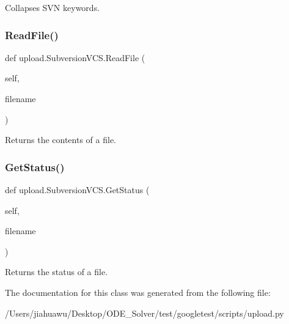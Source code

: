 \begin{DoxyVerb}Collapses SVN keywords.\end{DoxyVerb}
 \mbox{\label{classupload_1_1_subversion_v_c_s_a340d269b74386ac863636f6b0683d9f4}} 
\subsubsection{\texorpdfstring{Read\+File()}{ReadFile()}}
{\footnotesize\ttfamily def upload.\+Subversion\+V\+C\+S.\+Read\+File (\begin{DoxyParamCaption}\item[{}]{self,  }\item[{}]{filename }\end{DoxyParamCaption})}

\begin{DoxyVerb}Returns the contents of a file.\end{DoxyVerb}
 \mbox{\label{classupload_1_1_subversion_v_c_s_ac3785eb1fa561088206d01570f9fe982}} 
\subsubsection{\texorpdfstring{Get\+Status()}{GetStatus()}}
{\footnotesize\ttfamily def upload.\+Subversion\+V\+C\+S.\+Get\+Status (\begin{DoxyParamCaption}\item[{}]{self,  }\item[{}]{filename }\end{DoxyParamCaption})}

\begin{DoxyVerb}Returns the status of a file.\end{DoxyVerb}
 

The documentation for this class was generated from the following file\+:\begin{DoxyCompactItemize}
\item 
/\+Users/jiahuawu/\+Desktop/\+O\+D\+E\+\_\+\+Solver/test/googletest/scripts/upload.\+py\end{DoxyCompactItemize}
